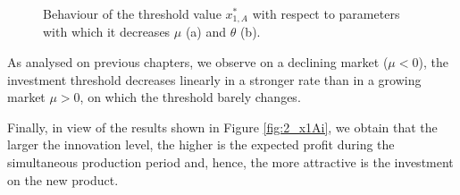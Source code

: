 \begin{figure}[!htb]
	\begin{subfigmatrix}{2}
	\end{subfigmatrix}
	\caption{Behaviour of the threshold value $x^*_{1,A}$ with respect to parameters with which it decreases $\mu$ (a) and $\theta$ (b).}
	\label{fig:2_x1Ad}
\end{figure}


As analysed on previous chapters, we observe on a declining market ($\mu<0$), the investment threshold decreases linearly in a stronger rate than in a growing market $\mu>0$, on which the threshold barely changes.
 
Finally, in view of the results shown in Figure \ref{fig:2_x1Ai}, we obtain that the larger the innovation level, the higher is the expected profit during the simultaneous production period and, hence, the more attractive is the investment on the new product.






